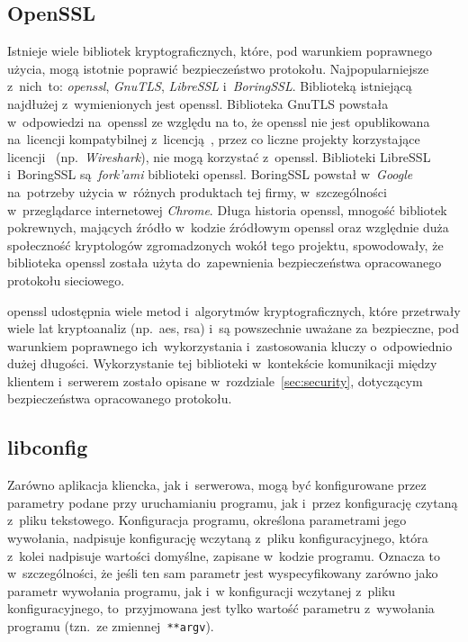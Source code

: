 \documentclass[thesis]{subfiles}
\begin{document}

\subsection{OpenSSL}

Istnieje wiele bibliotek kryptograficznych, które, pod warunkiem poprawnego użycia, mogą istotnie poprawić bezpieczeństwo protokołu. Najpopularniejsze z~nich~to: \emph{\gls{openssl}}, \emph{GnuTLS}, \emph{LibreSSL} i~\emph{BoringSSL}. Biblioteką istniejącą najdłużej z~wymienionych jest \gls{openssl}. Biblioteka GnuTLS powstała w~odpowiedzi na~\gls{openssl} ze względu na to, że \gls{openssl} nie jest opublikowana na~licencji kompatybilnej z~licencją~, przez co liczne projekty korzystające licencji~ (np.~\emph{Wireshark}), nie mogą korzystać z~\gls{openssl}. Biblioteki LibreSSL i~BoringSSL są~\emph{fork'ami} biblioteki \gls{openssl}. BoringSSL powstał w~\emph{Google} na~potrzeby użycia w~różnych produktach tej firmy, w~szczególności w~przeglądarce internetowej \emph{Chrome}. Długa historia \gls{openssl}, mnogość bibliotek pokrewnych, mających źródło w~kodzie źródłowym \gls{openssl} oraz względnie duża społeczność kryptologów zgromadzonych wokół tego projektu, spowodowały, że biblioteka \gls{openssl} została użyta do~zapewnienia bezpieczeństwa opracowanego protokołu sieciowego.

\gls{openssl} udostępnia wiele metod i~algorytmów kryptograficznych, które przetrwały wiele lat kryptoanaliz (np.~\gls{aes}, \gls{rsa}) i~są powszechnie uważane za bezpieczne, pod warunkiem poprawnego ich~wykorzystania i~zastosowania kluczy o~odpowiednio dużej długości. Wykorzystanie tej biblioteki w~kontekście komunikacji między klientem i~serwerem zostało opisane w~rozdziale~\ref{sec:security}, dotyczącym bezpieczeństwa opracowanego protokołu.


\subsection{libconfig}

Zarówno aplikacja kliencka, jak i~serwerowa, mogą być konfigurowane przez parametry podane przy uruchamianiu programu, jak i~przez konfigurację czytaną z~pliku tekstowego. Konfiguracja programu, określona parametrami jego wywołania, nadpisuje konfigurację wczytaną z~pliku konfiguracyjnego, która z~kolei nadpisuje wartości domyślne, zapisane w~kodzie programu. Oznacza to w~szczególności, że jeśli ten sam parametr jest wyspecyfikowany zarówno jako parametr wywołania programu, jak i~w konfiguracji wczytanej z~pliku konfiguracyjnego, to~przyjmowana jest tylko wartość parametru z~wywołania programu (tzn.~ze zmiennej~\texttt{**argv}).
\end{document}
